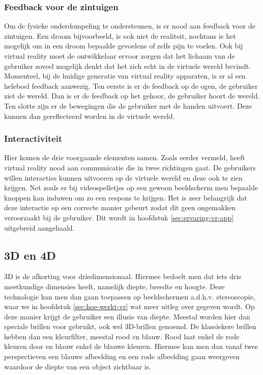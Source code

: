 \subsubsection{Feedback voor de zintuigen}
\label{ssubsec:feedback-van-zintuigen}
Om de fysieke onderdompeling te ondersteunen, is er nood aan feedback voor de zintuigen. Een droom bijvoorbeeld, is ook niet de realiteit, nochtans is het mogelijk om in een droom bepaalde gevoelens of zelfs pijn te voelen. Ook bij virtual reality moet de ontwikkelaar ervoor zorgen dat het lichaam van de gebruiker zoveel mogelijk denkt dat het zich echt in de virtuele wereld bevindt. Momenteel, bij de huidige generatie van virtual reality apparaten, is er al een heleboel feedback aanwezig. Ten eerste is er de feedback op de ogen, de gebruiker ziet de wereld. Dan is er de feedback op het gehoor, de gebruiker hoort de wereld. Ten slotte zijn er de bewegingen die de gebruiker met de handen uitvoert. Deze kunnen dan gereflecteerd worden in de virtuele wereld.

\subsubsection{Interactiviteit}
\label{ssubsec:interactiviteit}
Hier komen de drie voorgaande elementen samen. Zoals eerder vermeld, heeft virtual reality nood aan communicatie die in twee richtingen gaat. De gebruikers willen interacties kunnen uitvoeren op de virtuele wereld en deze ook te zien krijgen. Net zoals er bij videospelletjes op een gewoon beeldscherm men bepaalde knoppen kan induwen om zo een respons te krijgen. Het is zeer belangrijk dat deze interactie op een correcte manier gebeurt zodat dit geen ongemakken veroorzaakt bij de gebruiker. Dit wordt in hoofdstuk \ref{sec:ervaring-vr-app} uitgebreid aangehaald.

\subsection{3D en 4D}
\label{subsec:3d-4d}
3D is de afkorting voor driedimensionaal. Hiermee bedoelt men dat iets drie meetkundige dimensies heeft, namelijk diepte, breedte en hoogte. Deze technologie kan men dan gaan toepassen op beeldschermen a.d.h.v. stereoscopie, waar we in hoofdstuk \ref{sec:hoe-werkt-vr} wat meer uitleg over gegeven wordt. Op deze manier krijgt de gebruiker  een illusie van diepte. Meestal worden hier dan speciale brillen voor gebruikt, ook wel 3D-brillen genoemd. De klassiekere brillen hebben dan een kleurfilter, meestal rood en blauw. Rood laat enkel de rode kleuren door en blauw enkel de blauwe kleuren. Hiermee kan men dan vanaf twee perspectieven een blauwe afbeelding en een rode afbeelding gaan weergeven waardoor de diepte van een object zichtbaar is.

